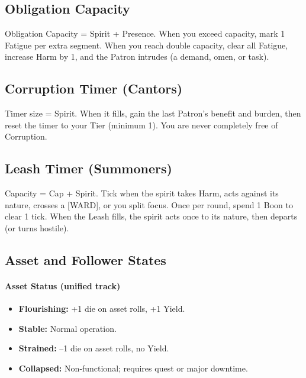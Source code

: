 \subsection{Obligation Capacity}\label{subsec:obligation_capacity}

Obligation Capacity = Spirit + Presence. When you exceed capacity, mark 1 Fatigue
per extra segment. When you reach double capacity, clear all Fatigue, increase
Harm by 1, and the Patron intrudes (a demand, omen, or task).

\subsection{Corruption Timer (Cantors)}\label{subsec:corruption_timer}

Timer size = Spirit. When it fills, gain the last Patron's benefit and burden,
then reset the timer to your Tier (minimum 1). You are never completely free of
Corruption.

\subsection{Leash Timer (Summoners)}\label{subsec:leash_timer}

Capacity = Cap + Spirit. Tick when the spirit takes Harm, acts against its
nature, crosses a [WARD], or you split focus. Once per round, spend 1 Boon to
clear 1 tick. When the Leash fills, the spirit acts once to its nature, then
departs (or turns hostile).

\subsection{Asset and Follower States}\label{subsec:asset_follower_states}

\paragraph{Asset Status (unified track)}
\begin{itemize}
    \item \textbf{Flourishing:} +1 die on asset rolls, +1 Yield.
    \item \textbf{Stable:} Normal operation.
    \item \textbf{Strained:} --1 die on asset rolls, no Yield.
    \item \textbf{Collapsed:} Non‑functional; requires quest or major downtime.
\end{itemize}

